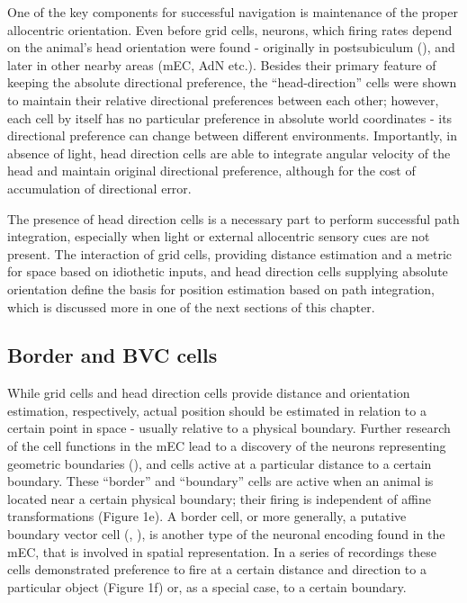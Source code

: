 One of the key components for successful navigation is maintenance of the proper allocentric orientation. Even before grid cells, neurons, which firing rates depend on the animal’s head orientation were found - originally in postsubiculum (\cite{Taube2007}), and later in other nearby areas (mEC, AdN etc.). Besides their primary feature of keeping the absolute directional preference, the “head-direction” cells were shown to maintain their relative directional preferences between each other; however, each cell by itself has no particular preference in absolute world coordinates - its directional preference can change between different environments. Importantly, in absence of light, head direction cells are able to integrate angular velocity of the head and maintain original directional preference, although for the cost of accumulation of directional error.

The presence of head direction cells is a necessary part to perform successful path integration, especially when light or external allocentric sensory cues are not present. The interaction of grid cells, providing distance estimation and a metric for space based on idiothetic inputs, and head direction cells supplying absolute orientation define the basis for position estimation based on path integration, which  is discussed more in one of the next sections of this chapter.


\subsection{Border and BVC cells}

While grid cells and head direction cells provide distance and orientation estimation, respectively, actual position should be estimated in relation to a certain point in space - usually relative to a physical boundary. Further research of the cell functions in the mEC lead to a discovery of the neurons representing geometric boundaries (\cite{Solstad2008}), and cells active at a particular distance to a certain boundary. These “border” and “boundary” cells are active when an animal is located near a certain physical boundary; their firing is independent of affine transformations (Figure 1e). A border cell, or more generally, a putative boundary vector cell (\cite{Barry2006}, \cite{Lever2009}), is another type of the neuronal encoding found in the mEC, that is involved in spatial representation. In a series of recordings these cells demonstrated preference to fire at a certain distance and direction to a particular object (Figure 1f) or, as a special case, to a certain boundary.

